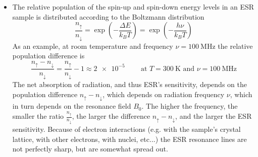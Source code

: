 \documentclass[11pt, a4paper]{article}
\begin{document}
\begin{itemize}
	\item The relative population of the spin-up and spin-down energy levels in an ESR sample is distributed according to the Boltzmann distribution
	\begin{equation*}
		\frac{n_{\uparrow}}{n_{\downarrow}} = \exp(-\frac{\Delta E}{k_{B}T}) = \exp(-\frac{h \nu}{k_{B}T})
	\end{equation*}
	As an example, at room temperature and frequency $ \nu = \SI{100}{\mega \hertz} $ the relative population difference is
	\begin{equation*}
		\frac{n_{\uparrow} - n_{\downarrow}}{n_{\downarrow}} = \frac{n_{\uparrow}}{n_{\downarrow}} - 1 \approx \SI{2e-5}{} \qquad \text{at } T =  \SI{300}{\kelvin} \text{ and } \nu = \SI{100}{\mega \hertz} 
	\end{equation*}
	The net absorption of radiation, and thus ESR's sensitivity, depends on the population difference $ n_{\uparrow} - n_{\downarrow} $, which depends on radiation frequency $ \nu $, which in turn depends on the resonance field $ B_{0} $. The higher the frequency, the smaller the ratio $ \frac{n_{\uparrow}}{n_{\downarrow}} $, the larger the difference $  n_{\uparrow} - n_{\downarrow} $, and the larger the ESR sensitivity.  Because of electron interactions (e.g. with the sample's crystal lattice, with other electrons, with nuclei, etc...) the ESR resonance lines are not perfectly sharp, but are somewhat spread out.
\end{itemize}
\end{document}

